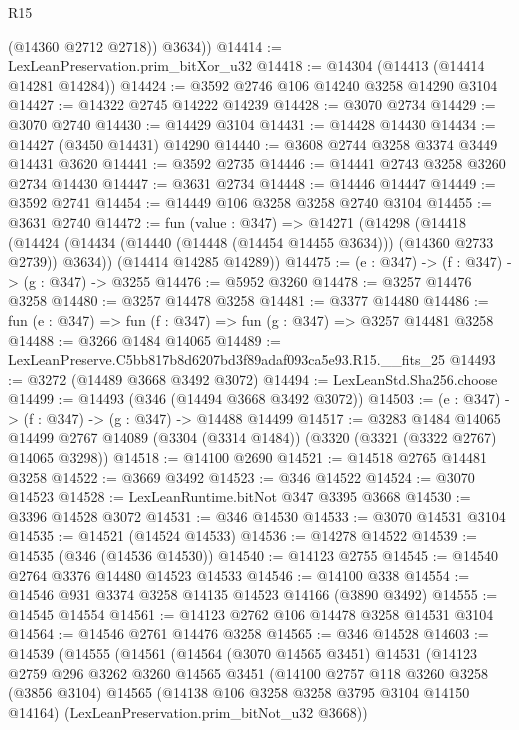 \begin{lexlean}{R15}
\begin{coremodule}
          (@14360 @2712 @2718))
        @3634))
@14414 := LexLeanPreservation.prim_bitXor_u32
@14418 := @14304 (@14413 (@14414 @14281 @14284))
@14424 := @3592 @2746 @106 @14240 @3258 @14290 @3104
@14427 := @14322 @2745 @14222 @14239
@14428 := @3070 @2734
@14429 := @3070 @2740
@14430 := @14429 @3104
@14431 := @14428 @14430
@14434 := @14427 (@3450 @14431) @14290
@14440 := @3608 @2744 @3258 @3374 @3449 @14431 @3620
@14441 := @3592 @2735
@14446 := @14441 @2743 @3258 @3260 @2734 @14430
@14447 := @3631 @2734
@14448 := @14446 @14447
@14449 := @3592 @2741
@14454 := @14449 @106 @3258 @3258 @2740 @3104
@14455 := @3631 @2740
@14472 := fun (value : @347) =>
  @14271
    (@14298
      (@14418 (@14424 (@14434 (@14440 (@14448 (@14454 @14455 @3634))) (@14360 @2733 @2739)) @3634))
      (@14414 @14285 @14289))
@14475 := (e : @347) -> (f : @347) -> (g : @347) -> @3255
@14476 := @5952 @3260
@14478 := @3257 @14476 @3258
@14480 := @3257 @14478 @3258
@14481 := @3377 @14480
@14486 := fun (e : @347) => fun (f : @347) => fun (g : @347) => @3257 @14481 @3258
@14488 := @3266 @1484 @14065
@14489 := LexLeanPreserve.C5bb817b8d6207bd3f89adaf093ca5e93.R15.__fits_25
@14493 := @3272 (@14489 @3668 @3492 @3072)
@14494 := LexLeanStd.Sha256.choose
@14499 := @14493 (@346 (@14494 @3668 @3492 @3072))
@14503 := (e : @347) -> (f : @347) -> (g : @347) -> @14488 @14499
@14517 := @3283
    @1484
    @14065
    @14499
    @2767
    @14089
    (@3304 (@3314 @1484))
    (@3320 (@3321 (@3322 @2767) @14065 @3298))
@14518 := @14100 @2690
@14521 := @14518 @2765 @14481 @3258
@14522 := @3669 @3492
@14523 := @346 @14522
@14524 := @3070 @14523
@14528 := LexLeanRuntime.bitNot @347 @3395 @3668
@14530 := @3396 @14528 @3072
@14531 := @346 @14530
@14533 := @3070 @14531 @3104
@14535 := @14521 (@14524 @14533)
@14536 := @14278 @14522
@14539 := @14535 (@346 (@14536 @14530))
@14540 := @14123 @2755
@14545 := @14540 @2764 @3376 @14480 @14523 @14533
@14546 := @14100 @338
@14554 := @14546 @931 @3374 @3258 @14135 @14523 @14166 (@3890 @3492)
@14555 := @14545 @14554
@14561 := @14123 @2762 @106 @14478 @3258 @14531 @3104
@14564 := @14546 @2761 @14476 @3258
@14565 := @346 @14528
@14603 := @14539
    (@14555
      (@14561
        (@14564
          (@3070 @14565 @3451)
          @14531
          (@14123
            @2759
            @296
            @3262
            @3260
            @14565
            @3451
            (@14100
              @2757
              @118
              @3260
              @3258
              (@3856 @3104)
              @14565
              (@14138 @106 @3258 @3258 @3795 @3104 @14150 @14164)
              (LexLeanPreservation.prim_bitNot_u32 @3668))

\end{coremodule}
\end{lexlean}
